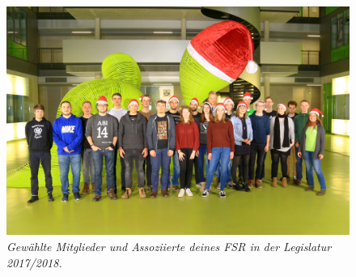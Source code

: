 \newpage
\mbox{}
\thispagestyle{empty}

\newpage

\begin{figure}[h!]
\centering
\includegraphics[width=\textwidth]{img/fsr_gewaehlt_assoziiert_1718}
\caption*{\small \textit{Gewählte Mitglieder und Assoziierte deines FSR in der Legislatur 2017/2018.}}
\end{figure}

